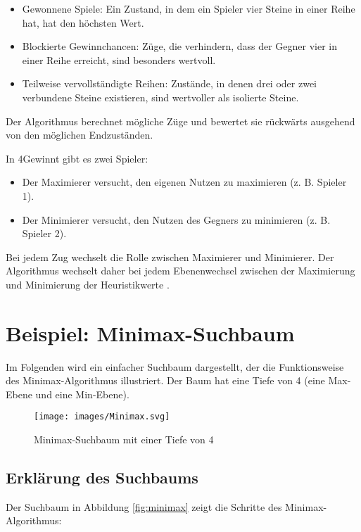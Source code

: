 \begin{itemize}
	\item Gewonnene Spiele: Ein Zustand, in dem ein Spieler vier Steine in einer Reihe hat, hat den höchsten Wert.
	\item Blockierte Gewinnchancen: Züge, die verhindern, dass der Gegner vier in einer Reihe erreicht, sind besonders wertvoll.
	\item Teilweise vervollständigte Reihen: Zustände, in denen drei oder zwei verbundene Steine existieren, sind wertvoller als isolierte Steine.
\end{itemize}

Der Algorithmus berechnet mögliche Züge und bewertet sie rückwärts ausgehend von den möglichen Endzuständen.

In 4Gewinnt gibt es zwei Spieler:

\begin{itemize}
	\item Der Maximierer versucht, den eigenen Nutzen zu maximieren (z. B. Spieler 1).
	\item Der Minimierer versucht, den Nutzen des Gegners zu minimieren (z. B. Spieler 2).
\end{itemize}

Bei jedem Zug wechselt die Rolle zwischen Maximierer und Minimierer. Der Algorithmus wechselt daher bei jedem Ebenenwechsel zwischen der Maximierung und Minimierung der Heuristikwerte \autocites{krusenotto_anwendungsbeispiel_2016}.

\section*{Beispiel: Minimax-Suchbaum}

Im Folgenden wird ein einfacher Suchbaum dargestellt, der die Funktionsweise des Minimax-Algorithmus illustriert. Der Baum hat eine Tiefe von 4 (eine Max-Ebene und eine Min-Ebene).

\begin{figure}[H]
	\centering
	\texttt{[image: images/Minimax.svg]}
	\caption[Minimax-Suchbaum \autocite{Wikipedia:Minimax}]{Minimax-Suchbaum mit einer Tiefe von 4}
\end{figure}

\subsection*{Erklärung des Suchbaums}

Der Suchbaum in Abbildung \ref{fig:minimax} zeigt die Schritte des Minimax-Algorithmus:

